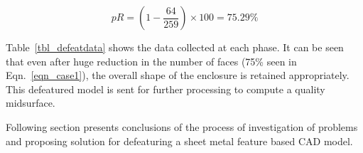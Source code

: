 \bigskip

\begin{equation}
pR = (1 - \frac{64}{259}) \times 100 = 75.29\%
\label{eqn_case1}
\end{equation}



Table~\ref{tbl_defeatdata} shows the data collected at each phase. It can be seen that even after huge reduction in the number of faces (75\% seen in Eqn.~\ref{eqn_case1}), the overall shape of the enclosure is retained appropriately. This defeatured model is sent for further processing to compute a quality midsurface.

Following section presents conclusions of the process of investigation of problems and proposing solution for defeaturing a sheet metal feature based CAD model.




